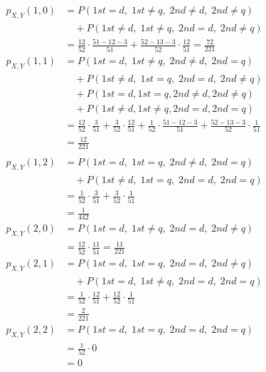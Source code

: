 \documentclass[12pt,border=4pt,multi]{article} %
\begin{document}
\begin{align*}
p_{X, Y}(1, 0) &= P(1st = d,\; 1st \not= q,\; 2nd \not= d,\; 2nd \not= q)\\
&\quad + P(1st \not= d,\; 1st \not= q,\; 2nd = d,\; 2nd \not= q)\\
&= \frac{12}{52} \cdot \frac{51 - 12 - 3}{51} + \frac{52 - 13 - 3}{52} \cdot \frac{12}{51} = \boxed{\frac{72}{221}}\\
p_{X, Y}(1, 1) &= P(1st = d,\; 1st \not= q,\; 2nd \not= d,\; 2nd = q)\\
&\quad + P(1st \not= d,\; 1st = q,\; 2nd = d,\; 2nd \not= q)\\
&\quad + P(1st = d, 1st = q, 2nd \not= d, 2nd \not= q)\\
&\quad + P(1st \not= d, 1st \not= q, 2nd = d, 2nd = q)\\
&= \frac{12}{52} \cdot \frac{3}{51} + \frac{3}{52} \cdot \frac{12}{51} + \frac{1}{52} \cdot \frac{51 - 12 - 3}{51} + \frac{52 - 13 - 3}{52} \cdot \frac{1}{51}\\
&= \boxed{\frac{12}{221}}\\
\end{align*}
\begin{align*}
p_{X, Y}(1, 2) &= P(1st = d,\; 1st = q,\; 2nd \not= d,\; 2nd = q)\\
&\quad + P(1st \not= d,\; 1st = q,\; 2nd = d,\; 2nd = q)\\
&= \frac{1}{52} \cdot \frac{3}{51} + \frac{3}{52} \cdot \frac{1}{51}\\
&= \boxed{\frac{1}{442}}\\
p_{X, Y}(2, 0) &= P(1st = d,\; 1st \not= q,\; 2nd = d,\; 2nd \not= q)\\
&= \frac{12}{52} \cdot \frac{11}{51} = \boxed{\frac{11}{221}}\\
p_{X, Y}(2, 1) &= P(1st = d,\; 1st = q,\; 2nd = d,\; 2nd \not= q)\\
&\quad + P(1st = d,\; 1st \not= q,\; 2nd = d,\; 2nd = q)\\
&= \frac{1}{52} \cdot \frac{12}{51} + \frac{12}{52} \cdot \frac{1}{51}\\
&= \boxed{\frac{2}{221}}\\
p_{X, Y}(2, 2) &= P(1st = d,\; 1st = q,\; 2nd = d,\; 2nd = q)\\
&= \frac{1}{52} \cdot 0\\ 
&= \boxed{0}\\
\end{align*}
\\
\\
\\
\end{document}
